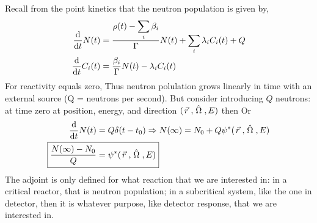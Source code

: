 \documentclass{school-22.211-notes}
\begin{document}
\clearpage
{}
Recall from the point kinetics that the neutron population is given by, 
\begin{align}
  \frac{\mathrm{d}}{\mathrm{d}t} N(t) &= \frac{\rho(t) - \displaystyle\sum_i \beta_i}{\Gamma} N(t) + \displaystyle\sum_i \lambda_i C_i(t) + Q \\
  \frac{\mathrm{d}}{\mathrm{d}t} C_i (t) &= \frac{\beta_i}{\Gamma} N(t) - \lambda_i C_i (t)
\end{align}
For reactivity equals zero, 
Thus neutron polulation grows linearly in time with an external source (Q = neutrons per second). But consider introducing $Q$ neutrons: at time zero at position, energy, and direction $(\left.\vec{r}\right., \left. \hat{\Omega} \right., E)$ then
Or 
\begin{align}
 \ddt N(t) &= Q \delta (t - t_0) \Rightarrow N(\infty) = N_0 + Q \psi^* (\vecr, \Omegahat, E)  \\
 \Aboxed{\frac{N(\infty) - N_0}{Q} &= \psi^* (\vecr, \Omegahat, E)  }
\end{align}
 The adjoint is only defined for what reaction that we are interested in: in a critical reactor, that is neutron population; in a subcritical system, like the one in detector, then it is whatever purpose, like detector response, that we are interested in. 
\end{document}
